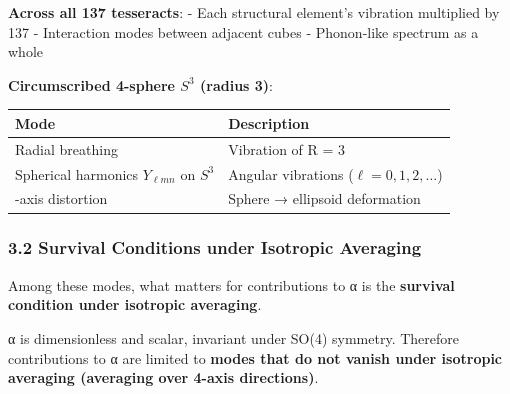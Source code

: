 \documentclass[
  11pt]{article}
\newcounter{none} %
\begin{document}
\textbf{Across all 137 tesseracts}: - Each structural element's
vibration multiplied by 137 - Interaction modes between adjacent cubes -
Phonon-like spectrum as a whole

\textbf{Circumscribed 4-sphere \(S^3\) (radius 3)}:

{\def\LTcaptype{none} %
\begin{longtable}[]{@{}
  >{\raggedright\arraybackslash}p{}
  >{\raggedright\arraybackslash}p{}@{}}
\toprule\noalign{}
\begin{minipage}[b]{\linewidth}\raggedright
Mode
\end{minipage} & \begin{minipage}[b]{\linewidth}\raggedright
Description
\end{minipage} \\
\midrule\noalign{}
\endhead
\bottomrule\noalign{}
\endlastfoot
Radial breathing & Vibration of R = 3 \\
Spherical harmonics \(Y_{\ell m n}\) on \(S^3\) & Angular vibrations
(\(\ell = 0, 1, 2, \ldots\)) \\
4-axis distortion & Sphere → ellipsoid deformation \\
\end{longtable}
}

\subsubsection{3.2 Survival Conditions under Isotropic
Averaging}\label{survival-conditions-under-isotropic-averaging}

Among these modes, what matters for contributions to α is the
\textbf{survival condition under isotropic averaging}.

α is dimensionless and scalar, invariant under SO(4) symmetry. Therefore
contributions to α are limited to \textbf{modes that do not vanish under
isotropic averaging (averaging over 4-axis directions)}.
\end{document}
